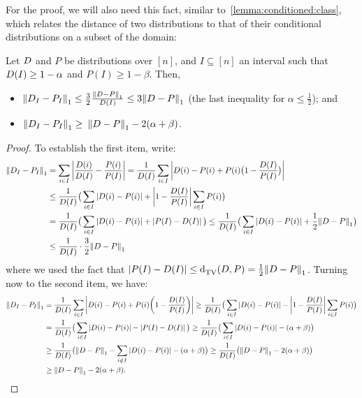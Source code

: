 \noindent For the proof, we will also need this fact, similar to~\cref{lemma:conditioned:class}, which relates the distance of two distributions to that of their conditional distributions on a subset of the domain:
\begin{fact}\label{lemma:conditioned:distr:distances}
Let $D$ and $P$ be distributions over $[n]$, and $I\subseteq[n]$ an interval such that $D(I) \geq 1- \alpha$ and $P(I) \geq 1- \beta$. Then,
\begin{itemize}
  \item ${\lVert D_I - P_I{\rVert}}_1 \leq \frac{3}{2}\frac{{\lVert D - P{\rVert}}_1}{D(I)} \leq 3{\lVert D - P{\rVert}}_1$ (the last inequality for $\alpha \leq \frac{1}{2}$); and 
  \item ${\lVert D_I - P_I{\rVert}}_1 \geq \frac{}{}{\lVert D - P{\rVert}}_1 - 2(\alpha+\beta)$.
\end{itemize}
\end{fact}

\iftrue
\begin{proof}
To establish the first item, write:
  \begin{align*}
      {\lVert\ensuremath{D}_I - P_I{\rVert}}_1 &=\sum_{i\in I}\left\lvert  \frac{D(i)}{D(I)} - \frac{P(i)}{P(I)}  \right\rvert
      = \frac{1}{D(I)}\sum_{i\in I}\left\lvert  D(i) - P(i) + P(i)\big(1- \frac{D(I)}{P(I)}\big)  \right\rvert \\
      &\leq \frac{1}{D(I)}\big( \sum_{i\in I}\left\lvert  D(i) - P(i)  \right\rvert + \left\lvert 1- \frac{D(I)}{P(I)}  \right\rvert \sum_{i\in I} P(i) \big)\\
      &= \frac{1}{D(I)}\big( \sum_{i\in I}\left\lvert  D(i) - P(i)  \right\rvert + \left\lvert P(I)- D(I)  \right\rvert \big)
      \leq \frac{1}{D(I)}\big( \sum_{i\in I}\left\lvert  D(i) - P(i)  \right\rvert + \frac{1}{2}{\lVert D-P{\rVert}}_1 \big)\\
     &\leq \frac{1}{D(I)} \cdot \frac{3}{2}{\lVert D-P{\rVert}}_1 
  \end{align*}
  where we used the fact that $\left\lvert P(I)- D(I)  \right\rvert\leq {\operatorname{d}_{\textrm{TV}}^{}\!\left({\ensuremath{D}, P}\right)} = \frac{1}{2}{\lVert D-P{\rVert}}_1$.
 Turning now to the second item, we have:
  \begin{align*}
      \normone{\D_I - P_I} &= \frac{1}{\D(I)}\sum_{i\in I}\abs{ \D(i) - P(i) + P(i)\mleft(1- \frac{\D(I)}{P(I)}\mright) } 
      \geq \frac{1}{\D(I)}\big( \sum_{i\in I}\abs{ \D(i) - P(i) } - \abs{1- \frac{\D(I)}{P(I)} } \sum_{i\in I} P(i) \big)\\
      &= \frac{1}{\D(I)}\big( \sum_{i\in I}\abs{ \D(i) - P(i) } - \abs{ P(I)- \D(I) } \big)
      \geq \frac{1}{\D(I)}\big( \sum_{i\in I}\abs{ \D(i) - P(i) } - (\alpha+\beta) \big)\\
     &\geq \frac{1}{\D(I)}\big( \normone{\D-P} - \sum_{i\notin I} \abs{ \D(i) - P(i) } - (\alpha+\beta) \big)
     \geq \frac{1}{\D(I)}\big( \normone{\D-P} - 2(\alpha+\beta) \big) \\
     &\geq \normone{\D-P} - 2(\alpha+\beta).  
  \end{align*}
\end{proof}
\fi

